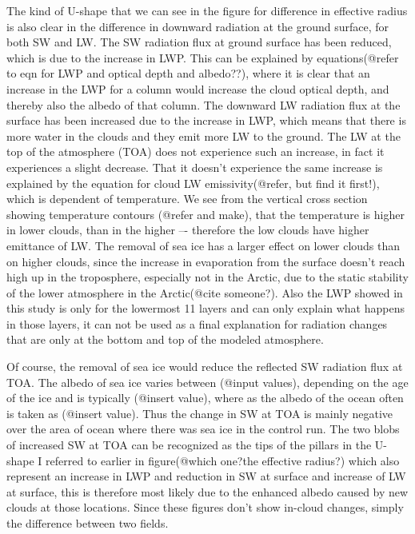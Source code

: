 The kind of U-shape that we can see in the figure for difference in effective radius is also clear in the difference in downward radiation at the ground surface, for both SW and LW. The SW radiation flux at ground surface has been reduced, which is due to the increase in LWP. This can be explained by equations(@refer to eqn for LWP and optical depth and albedo??), where it is clear that an increase in the LWP for a column would increase the cloud optical depth, and thereby also the albedo of that column. The downward LW radiation flux at the surface has been increased due to the increase in LWP, which means that there is more water in the clouds and they emit more LW to the ground. The LW at the top of the atmosphere (TOA) does not experience such an increase, in fact it experiences a slight decrease. That it doesn't experience the same increase is explained by the equation for cloud LW emissivity(@refer, but find it first!), which is dependent of temperature. We see from the vertical cross section showing temperature contours (@refer and make), that the temperature is higher in lower clouds, than in the higher –- therefore the low clouds have higher emittance of LW. The removal of sea ice has a larger effect on lower clouds than on higher clouds, since the increase in evaporation from the surface doesn't reach high up in the troposphere, especially not in the Arctic, due to the static stability of the lower atmosphere in the Arctic(@cite someone?). Also the LWP showed in this study is only for the lowermost 11 layers and can only explain what happens in those layers, it can not be used as a final explanation for radiation changes that are only at the bottom and top of the modeled atmosphere.

Of course, the removal of sea ice would reduce the reflected SW radiation flux at TOA. The albedo of sea ice varies between (@input values), depending on the age of the ice and is typically (@insert value), where as the albedo of the ocean often is taken as (@insert value). Thus the change in SW at TOA is mainly negative over the area of ocean where there was sea ice in the control run. The two blobs of increased SW at TOA can be recognized as the tips of the pillars in the U-shape I referred to earlier in figure(@which one?the effective radius?) which also represent an increase in LWP and reduction in SW at surface and increase of LW at surface, this is therefore most likely due to the enhanced albedo caused by new clouds at those locations. Since these figures don't show in-cloud changes, simply the difference between two fields.

